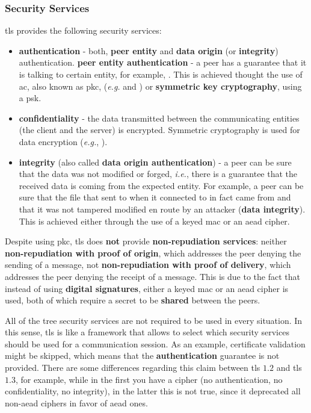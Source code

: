 \documentclass{llncs}
\begin{document}
\subsubsection{Security Services}
%
\gls{tls} provides the following security services:
\begin{itemize}
\item \textbf{authentication} - both, \textbf{peer entity} and \textbf{data origin} (or \textbf{integrity})
authentication.
\subitem \textbf{peer entity authentication} - a peer has a guarantee that it is talking to certain entity, for example, .
This is achieved thought the use of \gls{ac}, also known as \gls{pkc}, (\textit{e.g.}  and )
or \textbf{symmetric key cryptography}, using a \gls{psk}.
\item \textbf{confidentiality} - the data transmitted between the communicating
entities (the client and the server) is encrypted. Symmetric cryptography is
used for data encryption (\textit{e.g.}, ).
\item \textbf{integrity} (also called \textbf{data origin authentication}) - a peer can be sure that the data was not modified or forged,
\textit{i.e.}, there is a guarantee that the received data is coming from the expected entity. For example, a peer can be sure
that the  file that sent to when it connected to  in fact
came from  and that it was not tampered modified en
route by an attacker (\textbf{data integrity}). This is achieved either through the use
of a keyed \gls{mac} or an \gls{aead} cipher.
\end{itemize}

Despite using \gls{pkc}, \gls{tls} does \textbf{not} provide \textbf{non-repudiation services}:
neither \textbf{non-repudiation with proof of origin}, which addresses the peer denying
the sending of a message, not \textbf{non-repudiation with proof of delivery}, which
addresses the peer denying the receipt of a message. This is due to the fact that
instead of using \textbf{digital signatures}, either a keyed \gls{mac} or an \gls{aead}
cipher is used, both of which require a secret to be \textbf{shared} between the peers.

All of the tree security services are not required to be used in every situation.
In this sense, \gls{tls} is like a framework that allows to select which security services should be used for a communication session. As an example,
certificate validation might be skipped, which means that the \textbf{authentication} guarantee is not provided. There are some differences regarding this claim between \gls{tls} $1.2$\cite{RFC5246}
and \gls{tls} $1.3$, for example, while in the first you have a 
cipher (no authentication, no confidentiality, no integrity), in the latter
this is not true, since it deprecated all non-\gls{aead} ciphers in favor of
\gls{aead} ones.
\end{document}
